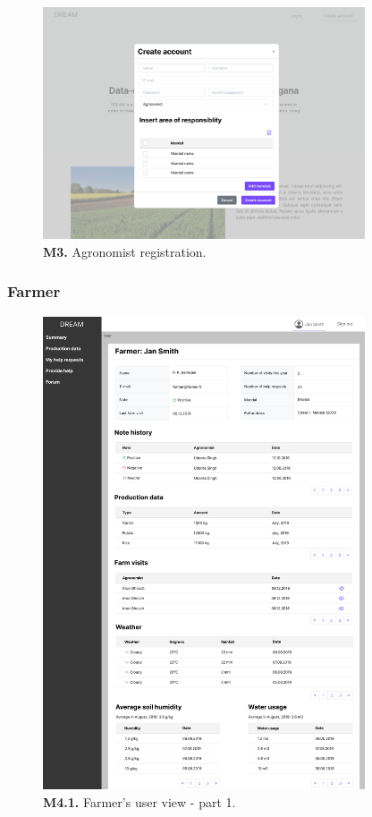 \begin{figure}[H]
    \centering
    \includegraphics[width=0.85\textwidth]{mockups/Unreg. user_Create account_Agronomist.png}
    \caption{\textbf{M3.} Agronomist registration.}
\end{figure}


\subsubsection{Farmer}


\begin{figure}[H]
    \centering
    \includegraphics[width=0.85\textwidth]{mockups/Farmer_User_part1.png}
    \caption{\textbf{M4.1.} Farmer's user view - part 1.}
\end{figure}

